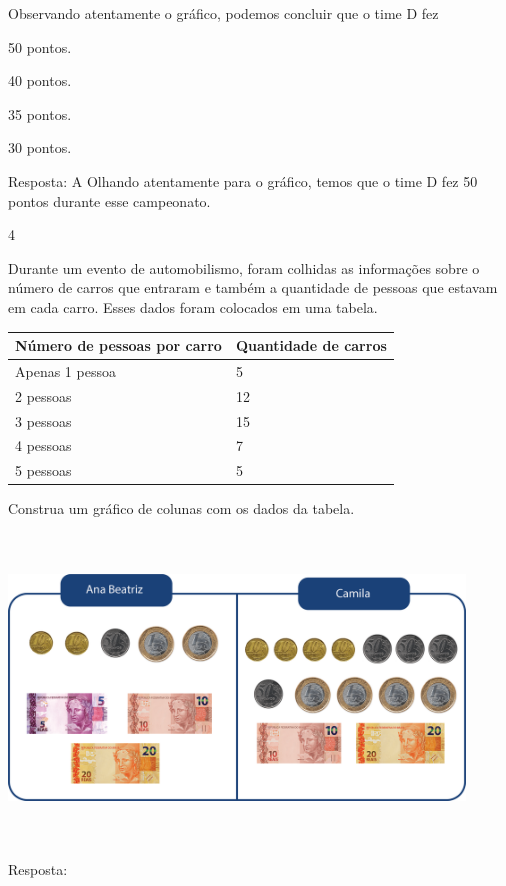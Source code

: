 \begin{multicols}{2}
\begin{enumerate}
{Observando atentamente o gráfico, podemos concluir que o time D fez

\begin{escolha}
\item
  50 pontos.
\item
  40 pontos.
\item
  35 pontos.
\item
  30 pontos.
\end{escolha}

Resposta: A
Olhando atentamente para o gráfico, temos que o time D fez 50 pontos
durante esse campeonato.

\num{4}

Durante um evento de automobilismo, foram colhidas as informações sobre o número de carros
que entraram e também a quantidade de pessoas que estavam em cada carro.
Esses dados foram colocados em uma tabela.

\begin{longtable}[]{@{}ll@{}}
\toprule
Número de pessoas por carro & Quantidade de carros\tabularnewline
\midrule
\endhead
Apenas 1 pessoa & 5\tabularnewline
2 pessoas & 12\tabularnewline
3 pessoas & 15\tabularnewline
4 pessoas & 7\tabularnewline
5 pessoas & 5\tabularnewline
\bottomrule
\end{longtable}

Construa um gráfico de colunas com os dados da tabela.


\includegraphics[width=4.76708in,height=3.21695in]{media/image95.png}

Resposta:

}
\end{enumerate}
\end{multicols}
